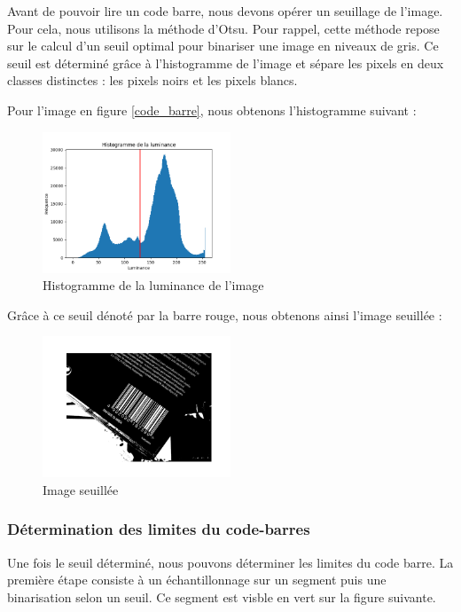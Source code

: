 \documentclass{rapport}
\begin{document}
Avant de pouvoir lire un code barre, nous devons opérer un seuillage de l'image. Pour cela, nous utilisons la méthode d'Otsu.
Pour rappel, cette méthode repose sur le calcul d'un seuil optimal pour binariser une image en niveaux de gris.
Ce seuil est déterminé grâce à l'histogramme de l'image et sépare les pixels en deux classes distinctes : les pixels noirs et les pixels blancs.

Pour l'image en figure \ref{code_barre}, nous obtenons l'histogramme suivant :

\begin{figure}[H] 
	\centering
	\includegraphics[width=0.5\textwidth]{images/histogramme.png}
	\caption{Histogramme de la luminance de l'image}
	\label{histogramme}
\end{figure}

Grâce à ce seuil dénoté par la barre rouge, nous obtenons ainsi l'image seuillée : 
\begin{figure}[H] 
	\centering
	\includegraphics[width=0.5\textwidth]{images/barcode_seuillee.png}
	\caption{Image seuillée}
	\label{img_seuillee}
\end{figure}

\subsubsection*{Détermination des limites du code-barres}
Une fois le seuil déterminé, nous pouvons déterminer les limites du code barre.
La première étape consiste à un échantillonnage sur un segment puis une binarisation selon un seuil. Ce segment est visble en vert sur la figure suivante.
\end{document}
